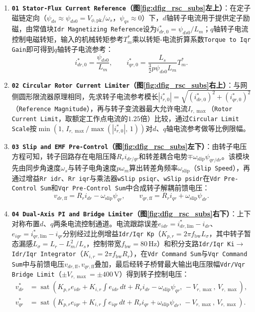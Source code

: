 \documentclass[UTF8,zihao=-4,fontset=none]{ctexrep}
\begin{document}
\begin{enumerate}
  \item \textbf{\texttt{01 Stator-Flux Current Reference}（图\ref{fig:dfig_rsc_subs}左上）}：在定子磁链定向（\(\psi_{ds}\approx\psi_{ds0}=V_{\phi,\mathrm{pk}}/\omega_s\)，\(\psi_{qs}\approx0\)）下，\(d\)轴转子电流用于提供定子励磁，由常值块\texttt{Idr Magnetizing Reference}设为\(i_{dr,0}^*=\psi_{ds0}/L_m\)；\(q\)轴转子电流控制电磁转矩，输入的机械转矩参考\(T_m^*\)乘以转矩-电流折算系数\texttt{Torque to Iqr Gain}即可得到\(q\)轴转子电流参考：
  \begin{equation}
    i_{dr,0}^*=\frac{\psi_{ds0}}{L_m},\qquad
    i_{qr,0}^*=\frac{L_s}{\frac{3}{2}p\psi_{ds0}L_m}T_m^*.
  \end{equation}
  \item \textbf{\texttt{02 Circular Rotor Current Limiter}（图\ref{fig:dfig_rsc_subs}右上）}：与网侧圆形限流器原理相同，先求转子电流参考模长\(|i_{r,0}^*|=\sqrt{(i_{dr,0}^*)^2+(i_{qr,0}^*)^2}\)（\texttt{Reference Magnitude}），再与转子变流器最大允许电流\(I_{r,\max}\)（\texttt{Rotor Current Limit}，取额定工作点电流的\(1.25\)倍）比较，通过\texttt{Circular Limit Scale}按\(\min(1,\,I_{r,\max}/\max(|i_{r,0}^*|,\,1))\)对\(d\)、\(q\)轴电流参考做等比例限幅。
  \item \textbf{\texttt{03 Slip and EMF Pre-Control}（图\ref{fig:dfig_rsc_subs}左下）}：由转子电压方程可知，转子回路存在电阻压降\(R_ri_{dr/qr}\)和转差耦合电势\(\mp\omega_{\mathrm{slip}}\psi_{qr/dr}\)。该模块先由同步角速度\(\omega_s\)与转子电角速度\(p\omega_m\)算出转差角频率\(\omega_{\mathrm{slip}}\)（\texttt{Slip Speed}），再通过增益\texttt{Rr idr}、\texttt{Rr iqr}与乘法器\texttt{wSlip psiqr}、\texttt{wSlip psidr}在\texttt{Vdr Pre-Control Sum}和\texttt{Vqr Pre-Control Sum}中合成转子解耦前馈电压：
  \begin{equation}
    v_{dr,\mathrm{ff}}=R_ri_{dr}-\omega_{\mathrm{slip}}\psi_{qr},\qquad
    v_{qr,\mathrm{ff}}=R_ri_{qr}+\omega_{\mathrm{slip}}\psi_{dr}.
  \end{equation}
  \item \textbf{\texttt{04 Dual-Axis PI and Bridge Limiter}（图\ref{fig:dfig_rsc_subs}右下）}：上下对称布置\(d\)、\(q\)两条电流控制通道。电流跟踪误差\(e_{idr}=i_{dr,\mathrm{lim}}^*-i_{dr}\)、\(e_{iqr}=i_{qr,\mathrm{lim}}^*-i_{qr}\)分别经过比例增益\texttt{Idr/Iqr Kp}（\(K_{p,r}=2\pi f_{\mathrm{bw}}L_\sigma\)，其中转子暂态漏感\(L_\sigma=L_r-L_m^2/L_s\)，控制带宽\(f_{\mathrm{bw}}=80\,\mathrm{Hz}\)）和积分支路\texttt{Idr/Iqr Ki}\(\to\)\texttt{Idr/Iqr Integrator}（\(K_{i,r}=2\pi f_{\mathrm{bw}}R_r\)），在\texttt{Vdr Command Sum}与\texttt{Vqr Command Sum}中与前馈电压\(v_{dr,\mathrm{ff}},v_{qr,\mathrm{ff}}\)叠加，最后经转子桥臂最大输出电压限幅\texttt{Vdr/Vqr Bridge Limit}（\(\pm V_{r,\max}=\pm400\,\mathrm{V}\)）得到转子控制电压：
  \begin{align}
    v_{dr}^*&=\operatorname{sat}\!\left(K_{p,r}e_{idr}+K_{i,r}\int e_{idr}\,dt+R_ri_{dr}-\omega_{\mathrm{slip}}\psi_{qr},\,-V_{r,\max},\,V_{r,\max}\right),\\
    v_{qr}^*&=\operatorname{sat}\!\left(K_{p,r}e_{iqr}+K_{i,r}\int e_{iqr}\,dt+R_ri_{qr}+\omega_{\mathrm{slip}}\psi_{dr},\,-V_{r,\max},\,V_{r,\max}\right).
  \end{align}
\end{enumerate}
\end{document}
